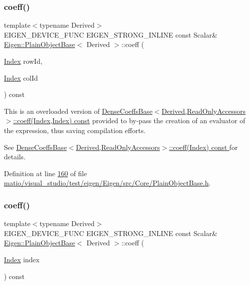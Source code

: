 \subsubsection{\texorpdfstring{coeff()}{coeff()}\hspace{0.1cm}{\footnotesize\ttfamily [2/4]}}
{\footnotesize\ttfamily template$<$typename Derived$>$ \\
E\+I\+G\+E\+N\+\_\+\+D\+E\+V\+I\+C\+E\+\_\+\+F\+U\+NC E\+I\+G\+E\+N\+\_\+\+S\+T\+R\+O\+N\+G\+\_\+\+I\+N\+L\+I\+NE const Scalar\& \hyperlink{class_eigen_1_1_plain_object_base}{Eigen\+::\+Plain\+Object\+Base}$<$ Derived $>$\+::coeff (\begin{DoxyParamCaption}\item[{\hyperlink{namespace_eigen_a62e77e0933482dafde8fe197d9a2cfde}{Index}}]{row\+Id,  }\item[{\hyperlink{namespace_eigen_a62e77e0933482dafde8fe197d9a2cfde}{Index}}]{col\+Id }\end{DoxyParamCaption}) const\hspace{0.3cm}{\ttfamily [inline]}}

This is an overloaded version of \hyperlink{group___core___module_ad41647ef695f9a5a58a9a0f50e2ae064}{Dense\+Coeffs\+Base$<$\+Derived,\+Read\+Only\+Accessors$>$\+::coeff(\+Index,\+Index) const} provided to by-\/pass the creation of an evaluator of the expression, thus saving compilation efforts.

See \hyperlink{group___core___module_ad52344ad1f42852db71996590d2de0de}{Dense\+Coeffs\+Base$<$\+Derived,\+Read\+Only\+Accessors$>$\+::coeff(\+Index) const }for details. 

Definition at line \hyperlink{matio_2visual__studio_2test_2eigen_2_eigen_2src_2_core_2_plain_object_base_8h_source_l00160}{160} of file \hyperlink{matio_2visual__studio_2test_2eigen_2_eigen_2src_2_core_2_plain_object_base_8h_source}{matio/visual\+\_\+studio/test/eigen/\+Eigen/src/\+Core/\+Plain\+Object\+Base.\+h}.

\mbox{\label{class_eigen_1_1_plain_object_base_af592e3993ea3d4ac9f073b42db2c04cc}} 
\subsubsection{\texorpdfstring{coeff()}{coeff()}\hspace{0.1cm}{\footnotesize\ttfamily [3/4]}}
{\footnotesize\ttfamily template$<$typename Derived$>$ \\
E\+I\+G\+E\+N\+\_\+\+D\+E\+V\+I\+C\+E\+\_\+\+F\+U\+NC E\+I\+G\+E\+N\+\_\+\+S\+T\+R\+O\+N\+G\+\_\+\+I\+N\+L\+I\+NE const Scalar\& \hyperlink{class_eigen_1_1_plain_object_base}{Eigen\+::\+Plain\+Object\+Base}$<$ Derived $>$\+::coeff (\begin{DoxyParamCaption}\item[{\hyperlink{namespace_eigen_a62e77e0933482dafde8fe197d9a2cfde}{Index}}]{index }\end{DoxyParamCaption}) const\hspace{0.3cm}{\ttfamily [inline]}}

